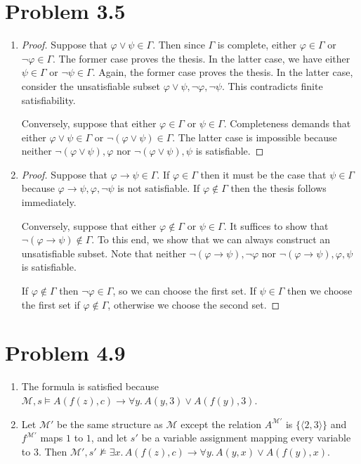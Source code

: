 \documentclass[a4paper]{article}
\begin{document}
\section{Problem 3.5}
\begin{enumerate}
\item
  \begin{proof}
    Suppose that $\varphi \vee \psi \in \Gamma$.
    Then since $\Gamma$ is complete, either $\varphi \in \Gamma$ or $\lnot \varphi \in \Gamma$.
    The former case proves the thesis.
    In the latter case, we have either $\psi \in \Gamma$ or $\lnot \psi \in \Gamma$.
    Again, the former case proves the thesis.
    In the latter case, consider the unsatisfiable subset $\varphi \vee \psi, \lnot \varphi, \lnot \psi$.
    This contradicts finite satisfiability.

    Conversely, suppose that either $\varphi \in \Gamma$ or $\psi \in \Gamma$.
    Completeness demands that either $\varphi \vee \psi \in \Gamma$ or $\lnot(\varphi \vee \psi) \in \Gamma$.
    The latter case is impossible because neither $\lnot(\varphi \vee \psi), \varphi$ nor $\lnot(\varphi \vee \psi), \psi$ is satisfiable.
  \end{proof}
\item
  \begin{proof}
    Suppose that $\varphi \to \psi \in \Gamma$.
    If $\varphi \in \Gamma$ then it must be the case that $\psi \in \Gamma$ because $\varphi \to \psi, \varphi, \lnot\psi$ is not satisfiable.
    If $\varphi \notin \Gamma$ then the thesis follows immediately.

    Conversely, suppose that either $\varphi \notin \Gamma$ or $\psi \in \Gamma$.
    It suffices to show that $\lnot(\varphi \to \psi) \notin \Gamma$.
    To this end, we show that we can always construct an unsatisfiable subset.
    Note that neither $\lnot(\varphi \to \psi), \lnot \varphi$ nor $\lnot(\varphi \to \psi), \varphi, \psi$ is satisfiable.

    If $\varphi \notin \Gamma$ then $\lnot\varphi \in \Gamma$, so we can choose the first set.
    If $\psi \in \Gamma$ then we choose the first set if $\varphi \notin \Gamma$, otherwise we choose the second set.
  \end{proof}
\end{enumerate}

\section{Problem 4.9}
\begin{enumerate}
\item The formula is satisfied because $\mathscr{M}, s \models A(f(z),c) \to \forall y.\,A(y,3) \vee A(f(y),3)$.
\item Let $\mathscr{M}'$ be the same structure as $\mathscr{M}$ except the relation $A^{\mathscr{M}'}$ is $\{\langle2,3\rangle\}$ and $f^{\mathscr{M}'}$ maps $1$ to $1$, and let $s'$ be a variable assignment mapping every variable to $3$.
  Then $\mathscr{M}',s' \nvDash \exists x.\,A(f(z),c) \to \forall y.\,A(y,x) \vee A(f(y),x)$.
\end{enumerate}

\end{document}
